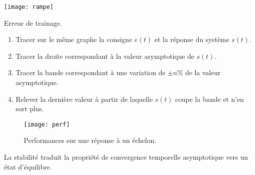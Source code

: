 \begin{marginfigure}[-2cm]
\texttt{[image: rampe]}
\caption{Erreur de trainage.}
\end{marginfigure}


\begin{methode}%

\begin{enumerate}
 \item Tracer sur le même graphe la consigne $e(t)$ et la réponse du système
$s(t)$.
\item Tracer la droite correspondant à la valeur asymptotique de $s(t)$.
\item Tracer la bande correspondant à une variation de $\pm n\%$ de la valeur
asymptotique.
\item Relever la dernière valeur à partir de laquelle $s(t)$ coupe la bande et
n'en sort plus.
\end{enumerate}
\end{methode}


\begin{figure}[!h]
\centering
\texttt{[image: perf]}
\caption{Performances sur une réponse à un échelon.}
\end{figure}

\begin{defi}[Stabilité]

La stabilité traduit la propriété de convergence temporelle asymptotique vers
un état d'équilibre. 
\end{defi}



